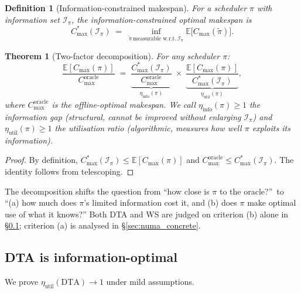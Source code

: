 \documentclass[11pt,a4paper]{article}
\newtheorem{theorem}{Theorem}[section]
\newtheorem{definition}{Definition}[section]
\begin{document}
\begin{definition}[Information-constrained makespan]\label{def:Cstar}
For a scheduler $\pi$ with information set $\mathcal{I}_\pi$, the
\emph{information-constrained optimal makespan} is
\[
  C_{\max}^*(\mathcal{I}_\pi)
  \;=\;
  \inf_{\tilde\pi\,\text{measurable w.r.t.}\,\mathcal{I}_\pi}
  \mathbb{E}\bigl[C_{\max}(\tilde\pi)\bigr].
\]
\end{definition}

\begin{theorem}[Two-factor decomposition]\label{thm:decomp}
For any scheduler $\pi$:
\[
  \frac{\mathbb{E}[C_{\max}(\pi)]}{C_{\max}^{\mathrm{oracle}}}
  \;=\;
  \underbrace{\frac{C_{\max}^*(\mathcal{I}_\pi)}{C_{\max}^{\mathrm{oracle}}}}_{\displaystyle\eta_{\mathrm{info}}(\pi)}\;
  \times\;
  \underbrace{\frac{\mathbb{E}[C_{\max}(\pi)]}{C_{\max}^*(\mathcal{I}_\pi)}}_{\displaystyle\eta_{\mathrm{util}}(\pi)},
\]
where $C_{\max}^{\mathrm{oracle}}$ is the offline-optimal makespan.
We call $\eta_{\mathrm{info}}(\pi) \geq 1$ the \emph{information gap} (structural,
cannot be improved without enlarging $\mathcal{I}_\pi$) and
$\eta_{\mathrm{util}}(\pi) \geq 1$ the \emph{utilisation ratio} (algorithmic,
measures how well $\pi$ exploits its information).
\end{theorem}

\begin{proof}
By definition, $C_{\max}^*(\mathcal{I}_\pi) \leq \mathbb{E}[C_{\max}(\pi)]$
and $C_{\max}^{\mathrm{oracle}} \leq C_{\max}^*(\mathcal{I}_\pi)$.
The identity follows from telescoping.
\end{proof}

The decomposition shifts the question from
``how close is $\pi$ to the oracle?''\ to
``(a) how much does $\pi$'s limited information cost it, and
(b) does $\pi$ make optimal use of what it knows?''
Both DTA and WS are judged on criterion (b) alone in \S\ref{sec:info_optimality_proof};
criterion (a) is analysed in \S\ref{sec:numa_concrete}.

\subsection{DTA is information-optimal}
\label{sec:info_optimality_proof}

We prove $\eta_{\mathrm{util}}(\mathrm{DTA}) \to 1$ under mild assumptions.
\end{document}
